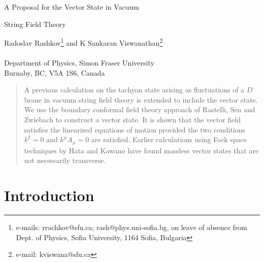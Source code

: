 \documentclass[a4paper,12pt]{article}
\begin{document}
\vspace*{1cm}

\begin{center}
{\bf{\Large A Proposal for the Vector State in Vacuum \\
\vspace*{.35cm}

String Field Theory }}

\vspace*{1cm}

Radoslav Rashkov\footnote{e-mails: rrachkov@sfu.ca; rash@phys.uni-sofia.bg,
on leave of absence from Dept. of Physics, Sofia University, 1164 Sofia,
Bulgaria}
and K Sankaran Viswanathan\footnote{e-mail: kviswana@sfu.ca}\\

\ \\
Department of Physics, Simon Fraser University \\
Burnaby, BC, V5A 1S6, Canada
\end{center}


\vspace*{.8cm}

\begin{abstract}
A previous calculation on the tachyon state arising as fluctuations
of a $D$ brane in vacuum string field theory is extended to include
the vector state. We use the boundary conformal field theory approach
of Rastelli, Sen and Zwiebach to construct a vector state. It is shown
that the vector field satisfies the linearized equations of motion provided 
the two conditions $k^2=0$ and $k^\mu A_\mu=0$ are satisfied. Earlier
calculations using Fock space techniques by Hata and Kawano have found
massless vector states that are not necessarily transverse.
\end{abstract}

\vspace*{.8cm}

\section{Introduction}
\end{document}
